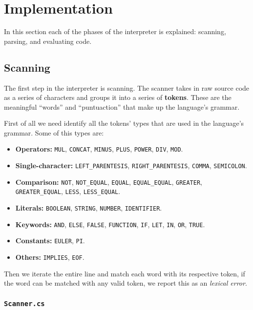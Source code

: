 \documentclass[a4paper, 12pt]{report}
\begin{document}
\section*{Implementation}

In this section each of the phases of the interpreter is explained: scanning, parsing, and evaluating code.

\subsection*{Scanning}

The first step in the interpreter is scanning. The scanner takes in raw source code as a series of characters
and groups it into a series of {\bf tokens}. These are the meaningful ``words'' and ``puntuaction'' that make 
up the language's grammar.

First of all we need identify all the tokens' types that are used in the language's grammar. Some of this types are:

\begin{itemize}
  \item {\bf Operators:} {\tt MUL}, {\tt CONCAT}, {\tt MINUS}, {\tt PLUS}, {\tt POWER}, {\tt DIV}, {\tt MOD}.
  \item {\bf Single-character:} {\tt LEFT\_PARENTESIS}, {\tt RIGHT\_PARENTESIS}, {\tt COMMA}, {\tt SEMICOLON}.
  \item {\bf Comparison:} {\tt NOT}, {\tt NOT\_EQUAL}, {\tt EQUAL}, {\tt EQUAL\_EQUAL}, {\tt GREATER}, {\tt GREATER\_EQUAL}, {\tt LESS}, 
    {\tt LESS\_EQUAL}.
  \item {\bf Literals:} {\tt BOOLEAN}, {\tt STRING}, {\tt NUMBER}, {\tt IDENTIFIER}.
  \item {\bf Keywords:} {\tt AND}, {\tt ELSE}, {\tt FALSE}, {\tt FUNCTION}, {\tt IF}, {\tt LET}, {\tt IN}, {\tt OR}, {\tt TRUE}.
  \item {\bf Constants:} {\tt EULER}, {\tt PI}.
  \item {\bf Others:} {\tt IMPLIES}, {\tt EOF}. 
\end{itemize}

Then we iterate the entire line and match each word with its respective token, if the word can be matched with any valid token, we report this as an {\em lexical error}. 

\subsubsection*{\tt Scanner.cs}
\end{document}
